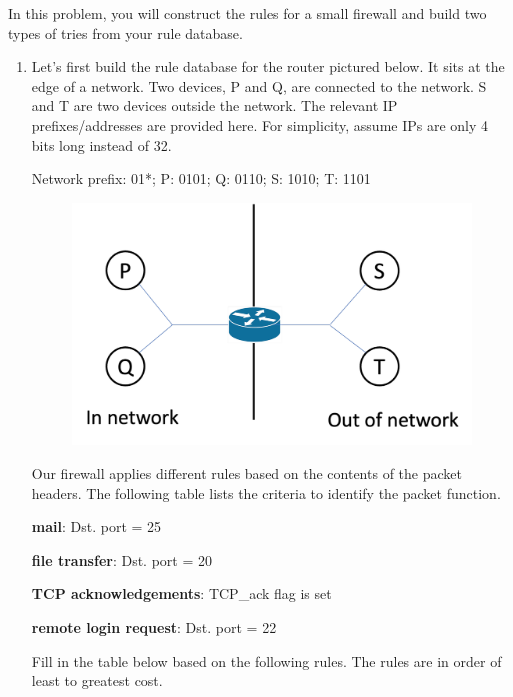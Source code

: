 \documentclass[10pt]{article}
\newenvironment{problem}[2][Problem]{\begin{trivlist}
\item[\hskip \labelsep {\bfseries #1}\hskip \labelsep {\bfseries #2.}]}{\end{trivlist}}
\begin{document}
\begin{problem}{2: Building a Firewall}
In this problem, you will construct the rules for a small firewall and build two types of tries from your rule database.
\begin{enumerate}
    \item Let's first build the rule database for the router pictured below. It sits at the edge of a network. Two devices, P and Q, are connected to the network. S and T are two devices outside the network. The relevant IP prefixes/addresses are provided here. For simplicity, assume IPs are only 4 bits long instead of 32.
    
    Network prefix: 01*; P: 0101; Q: 0110; S: 1010; T: 1101
    
\begin{figure}[h]
    \centering
    \includegraphics[scale=0.23]{figures/firewall.pdf}
    \label{fig:firewall}
\end{figure}
    
    Our firewall applies different rules based on the contents of the packet headers. The following table lists the criteria to identify the packet function.
    
    \hspace*{10mm} \textbf{mail}: Dst. port = 25
    
    \hspace*{10mm} \textbf{file transfer}: Dst. port = 20
    
    \hspace*{10mm} \textbf{TCP acknowledgements}: TCP\_ack flag is set
    
    \hspace*{10mm} \textbf{remote login request}: Dst. port = 22
    
    Fill in the table below based on the following rules. The rules are in order of least to greatest cost.
    

\end{enumerate}
\end{problem}
\end{document}
